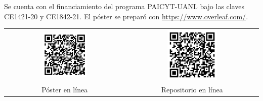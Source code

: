 \documentclass[a0]{sciposter} %
\begin{document}
\begin{multicols}{3}
Se cuenta con el financiamiento del programa PAICYT-UANL bajo las claves CE1421-20 y CE1842-21. El póster se preparó con \url{https://www.overleaf.com/}.

{\tiny }

\begin{table}
	\centering
	\begin{tabular}{c c}
		\includegraphics[width=0.39\textwidth]{qr-code-poster.png} & \includegraphics[width=0.39\textwidth]{qr-code.png} \\
		Póster en línea & Repositorio en línea
	\end{tabular}
\end{table}
    
\end{multicols}
\end{document}
